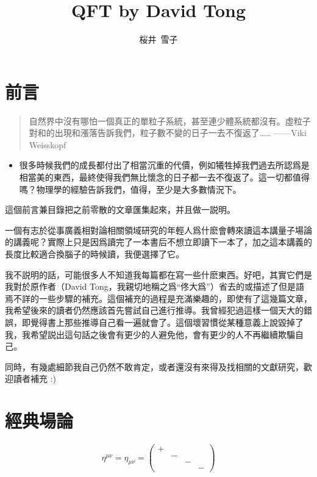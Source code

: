 \documentclass{article}
\title{QFT by David Tong}
\author{桜井\ 雪子}
\date{}
\begin{document}
\maketitle

\setcounter{section}{-1}

\section{前言}

\begin{quote}
  自然界中沒有哪怕一個真正的單粒子系統，甚至連少體系統都沒有。虛粒子對和的出現和漲落告訴我們，粒子數不變的日子一去不復返了…… ——Viki Weisskopf
\end{quote}

\begin{itemize}
  \item 很多時候我們的成長都付出了相當沉重的代價，例如犧牲掉我們過去所認爲是相當美的東西，最終使得我們無比懷念的日子都一去不復返了。這一切都值得嗎？物理學的經驗告訴我們，值得，至少是大多數情況下。
\end{itemize}

這個前言兼目錄把之前零散的文章匯集起來，并且做一説明。

一個有志於從事廣義相對論相關領域研究的年輕人爲什麽會轉來讀這本講量子場論的講義呢？實際上只是因爲讀完了一本書后不想立即讀下一本了，加之這本講義的長度比較適合換腦子的時候讀，我便選擇了它。

我不説明的話，可能很多人不知道我每篇都在寫一些什麽東西。好吧，其實它們是我對於原作者（David Tong，我親切地稱之爲“佟大爲”）省去的或描述了但是語焉不詳的一些步驟的補充。這個補充的過程是充滿樂趣的，即使有了這幾篇文章，我希望後來的讀者仍然應該首先嘗試自己進行推導。我曾經犯過這樣一個天大的錯誤，即覺得書上那些推導自己看一遍就會了。這個壞習慣從某種意義上說毀掉了我，我希望説出這句話之後會有更少的人避免他，會有更少的人不再繼續欺騙自己。

同時，有幾處細節我自己仍然不敢肯定，或者還沒有來得及找相關的文獻研究，歡迎讀者補充 :)

\section{經典場論}

$$\eta^{\mu\nu}=\eta_{\mu\nu}=\begin{pmatrix}
    + &   &   &   \\
      & - &   &   \\
      &   & - &   \\
      &   &   & -
  \end{pmatrix}$$
\end{document}
